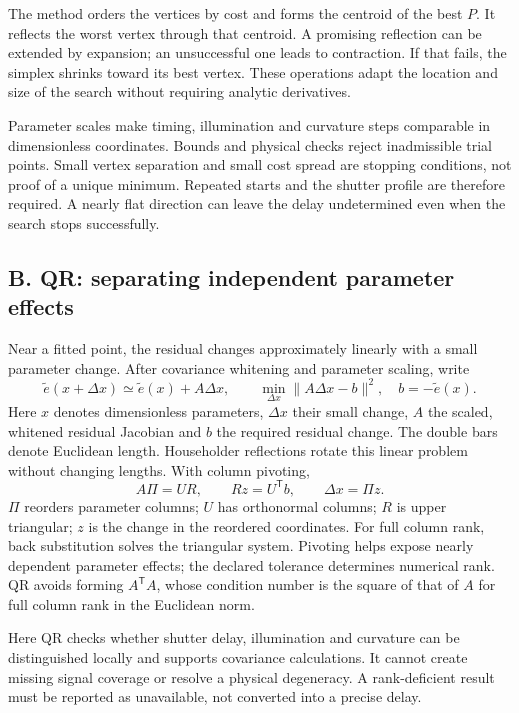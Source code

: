 \documentclass[11pt,a4paper]{article}
\begin{document}
The method orders the vertices by cost and forms the centroid of the best $P$.
It reflects the worst vertex through that centroid. A promising reflection can
be extended by expansion; an unsuccessful one leads to contraction. If that
fails, the simplex shrinks toward its best vertex. These operations adapt the
location and size of the search without requiring analytic derivatives.

Parameter scales make timing, illumination and curvature steps comparable in
dimensionless coordinates. Bounds and physical checks reject inadmissible trial
points. Small vertex separation and small cost spread are stopping conditions,
not proof of a unique minimum. Repeated starts and the shutter profile are
therefore required. A nearly flat direction can leave the delay undetermined
even when the search stops successfully.

\subsection*{B. QR: separating independent parameter effects}
Near a fitted point, the residual changes approximately linearly with a small
parameter change. After covariance whitening and parameter scaling, write
\[
\widetilde e(x+\Delta x)\simeq\widetilde e(x)+A\Delta x,
\qquad \min_{\Delta x}\|A\Delta x-b\|^2,
\quad b=-\widetilde e(x).
\]
Here $x$ denotes dimensionless parameters, $\Delta x$ their small change,
$A$ the scaled, whitened residual Jacobian and $b$ the required residual change.
The double bars denote Euclidean length. Householder reflections rotate this
linear problem without changing lengths. With column pivoting,
\[
A\Pi=UR,\qquad Rz=U^{\mathsf T}b,\qquad \Delta x=\Pi z.
\]
$\Pi$ reorders parameter columns; $U$ has orthonormal columns; $R$ is upper
triangular; $z$ is the change in the reordered coordinates. For full column
rank, back substitution solves the triangular system. Pivoting helps expose
nearly dependent parameter effects; the declared tolerance determines numerical
rank. QR avoids forming $A^{\mathsf T}A$, whose condition number is the square
of that of $A$ for full column rank in the Euclidean norm.

Here QR checks whether shutter delay, illumination and curvature can be
distinguished locally and supports covariance calculations. It cannot create
missing signal coverage or resolve a physical degeneracy. A rank-deficient
result must be reported as unavailable, not converted into a precise delay.
\end{document}
